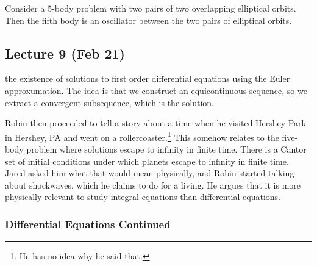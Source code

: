 \documentclass[10pt, twoside]{article}
\begin{document}
    \begin{exm} Consider a $5$-body problem with two pairs of two overlapping
    elliptical orbits. Then the fifth body is an oscillator between the two
pairs of elliptical orbits.  \end{exm}

    \subsection{Lecture 9 (Feb 21)}%
    the existence of solutions to first order differential equations using the
    Euler approxumation. The idea is that we construct an equicontinuous
    sequence, so we extract a convergent subsequence, which is the solution.

    Robin then proceeded to tell a story about a time when he visited Hershey
    Park in Hershey, PA and went on a rollercoaster.\footnote{He has no idea
    why he said that.} This somehow relates to the five-body problem where
    solutions escape to infinity in finite time. There is a Cantor set of
    initial conditions under which planets escape to infinity in finite time.
    Jared asked him what that would mean physically, and Robin started talking
    about shockwaves, which he claims to do for a living. He argues that it is
    more physically relevant to study integral equations than differential
    equations.

    \subsubsection{Differential Equations Continued}%
\end{document}
